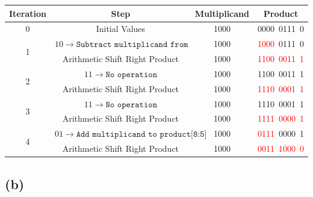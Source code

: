 \documentclass[12pt]{article}
\begin{document}
\begin{table}[h!]
    \centering
        \begin{tabular}{|c|c|c|c|}
        \hline
        \textbf{Iteration} & \textbf{Step} & \textbf{Multiplicand} & \textbf{Product}  \\
         \hline
            0 & Initial Values & 1000 & 0000\ 0111\ 0 \\
            \hline
            \multirow{2}{*}{1} 
             & $10\rightarrow\texttt{Subtract multiplicand from product[8:5]}$ & 1000 & \textcolor{red}{1000}\ 0111\ 0 \\
            \cline{2-4}
             & Arithmetic Shift Right Product & 1000 & \textcolor{red}{1100\ 0011\ 1} \\
            \hline
            \multirow{2}{*}{2}
             & $11\rightarrow\texttt{No operation}$ & 1000 & 1100\ 0011\ 1 \\
            \cline{2-4}
             & Arithmetic Shift Right Product & 1000 & \textcolor{red}{1110\ 0001\ 1} \\
            \hline
            \multirow{2}{*}{3}
             & $11\rightarrow\texttt{No operation}$ & 1000 & 1110\ 0001\ 1 \\
            \cline{2-4}
             & Arithmetic Shift Right Product & 1000 & \textcolor{red}{1111\ 0000\ 1} \\
            \hline
            \multirow{2}{*}{4}
             & $01\rightarrow\texttt{Add multiplicand to product[8:5]}$ & 1000 & \textcolor{red}{0111}\ 0000\ 1 \\
            \cline{2-4}
             & Arithmetic Shift Right Product & 1000 & \textcolor{red}{0011\ 1000\ 0} \\
            \hline
        \end{tabular}
\end{table}

\subsection*{(b)}
\end{document}
